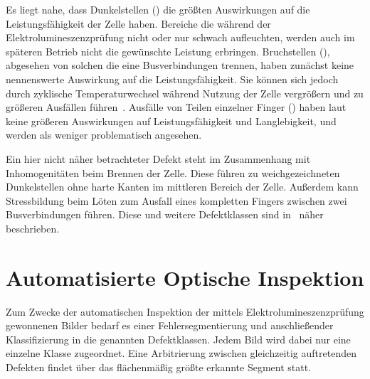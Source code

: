 Es liegt nahe, dass Dunkelstellen () die größten Auswirkungen auf die Leistungsfähigkeit der Zelle haben. Bereiche die während der Elektrolumineszenzprüfung nicht oder nur schwach aufleuchten, werden auch im späteren Betrieb nicht die gewünschte Leistung erbringen. Bruchstellen (), abgesehen von solchen die eine Busverbindungen trennen, haben zunächst keine nennenswerte Auswirkung auf die Leistungsfähigkeit. Sie können sich jedoch durch zyklische Temperaturwechsel während Nutzung der Zelle vergrößern und zu größeren Ausfällen führen~\cite{Deitsch2018}. Ausfälle von Teilen einzelner Finger () haben laut~\cite{Köntges2014} keine größeren Auswirkungen auf Leistungsfähigkeit und Langlebigkeit, und werden als weniger problematisch angesehen.

Ein hier nicht näher betrachteter Defekt steht im Zusammenhang mit Inhomogenitäten beim Brennen der Zelle. Diese führen zu weichgezeichneten Dunkelstellen ohne harte Kanten im mittleren Bereich der Zelle. Außerdem kann Stressbildung beim Löten zum Ausfall eines kompletten Fingers zwischen zwei Busverbindungen führen. Diese und weitere Defektklassen sind in~\cite{Köntges2014} näher beschrieben.

\section{Automatisierte Optische Inspektion}

Zum Zwecke der automatischen Inspektion der mittels Elektrolumineszenzprüfung gewonnenen Bilder bedarf es einer Fehlersegmentierung und anschließender Klassifizierung in die genannten Defektklassen. Jedem Bild wird dabei nur eine einzelne Klasse zugeordnet. Eine Arbitrierung zwischen gleichzeitig auftretenden Defekten findet über das flächenmäßig größte erkannte Segment statt.

